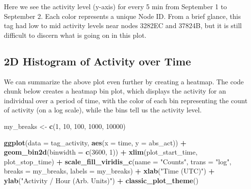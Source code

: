 \documentclass[
]{book}
\newenvironment{Shaded}{\begin{snugshade}}{\end{snugshade}}
\newcommand{\AttributeTok}[1]{\textcolor[rgb]{0.13,0.29,0.53}{#1}}
\newcommand{\DecValTok}[1]{\textcolor[rgb]{0.00,0.00,0.81}{#1}}
\newcommand{\FunctionTok}[1]{\textcolor[rgb]{0.13,0.29,0.53}{\textbf{#1}}}
\newcommand{\NormalTok}[1]{#1}
\newcommand{\OtherTok}[1]{\textcolor[rgb]{0.56,0.35,0.01}{#1}}
\newcommand{\SpecialCharTok}[1]{\textcolor[rgb]{0.81,0.36,0.00}{\textbf{#1}}}
\newcommand{\StringTok}[1]{\textcolor[rgb]{0.31,0.60,0.02}{#1}}
\begin{document}
Here we see the activity level (y-axis) for every 5 min from September 1 to September 2. Each color represents a unique Node ID. From a brief glance, this tag had low to mid activity levels near nodes 3282EC and 37824B, but it is still difficult to discern what is going on in this plot.

\subsection{2D Histogram of Activity over Time}\label{d-histogram-of-activity-over-time}

We can summarize the above plot even further by creating a heatmap. The code chunk below creates a heatmap bin plot, which displays the activity for an individual over a period of time, with the color of each bin representing the count of activity (on a log scale), while the bins tell us the activity level.

\begin{Shaded}
\begin{Highlighting}[]
\NormalTok{my\_breaks }\OtherTok{\textless{}{-}} \FunctionTok{c}\NormalTok{(}\DecValTok{1}\NormalTok{, }\DecValTok{10}\NormalTok{, }\DecValTok{100}\NormalTok{, }\DecValTok{1000}\NormalTok{, }\DecValTok{10000}\NormalTok{)}

\FunctionTok{ggplot}\NormalTok{(}\AttributeTok{data =}\NormalTok{ tag\_activity, }
       \FunctionTok{aes}\NormalTok{(}\AttributeTok{x =}\NormalTok{ time, }
           \AttributeTok{y =}\NormalTok{ abs\_act)) }\SpecialCharTok{+}
  \FunctionTok{geom\_bin2d}\NormalTok{(}\AttributeTok{binwidth =} \FunctionTok{c}\NormalTok{(}\DecValTok{3600}\NormalTok{, }\DecValTok{1}\NormalTok{)) }\SpecialCharTok{+}
  \FunctionTok{xlim}\NormalTok{(plot\_start\_time, }
\NormalTok{       plot\_stop\_time) }\SpecialCharTok{+}
  \FunctionTok{scale\_fill\_viridis\_c}\NormalTok{(}\AttributeTok{name =} \StringTok{"Counts"}\NormalTok{, }
                       \AttributeTok{trans =} \StringTok{"log"}\NormalTok{, }
                       \AttributeTok{breaks =}\NormalTok{ my\_breaks, }
                       \AttributeTok{labels =}\NormalTok{ my\_breaks) }\SpecialCharTok{+}
  \FunctionTok{xlab}\NormalTok{(}\StringTok{"Time (UTC)"}\NormalTok{) }\SpecialCharTok{+}
  \FunctionTok{ylab}\NormalTok{(}\StringTok{"Activity / Hour (Arb. Units)"}\NormalTok{) }\SpecialCharTok{+}  
  \FunctionTok{classic\_plot\_theme}\NormalTok{()}
\end{Highlighting}
\end{Shaded}
\end{document}
